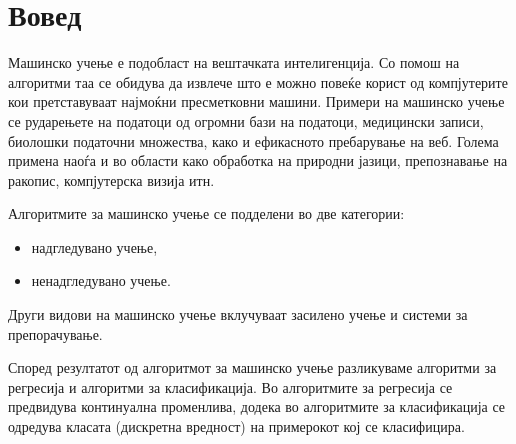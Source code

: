 \documentclass[12pt,a4paper]{article}
\begin{document}
\thispagestyle{empty}


\tableofcontents
\newpage

\listoffigures

\newpage

\section{Вовед}

Машинско учење е подобласт на вештачката интелигенција. Со помош на алгоритми
таа се обидува да извлече што е можно повеќе корист од компјутерите кои
претставуваат најмоќни пресметковни машини. Примери на машинско учење се
рударењете на податоци од огромни бази на податоци, медицински записи, биолошки
податочни множества, како и ефикасното пребарување на веб. Голема примена наоѓа
и во области како обработка на природни јазици, препознавање на ракопис,
компјутерска визија итн.

Алгоритмите за машинско учење се подделени во две категории:
\begin{itemize}
  \item надгледувано учење,
  \item ненадгледувано учење.
\end{itemize}
Други видови на машинско учење вклучуваат засилено учење и системи за
препорачување.

Според резултатот од алгоритмот за машинско учење разликуваме алгоритми за
регресија и алгоритми за класификација. Во алгоритмите за регресија се
предвидува континуална променлива, додека во алгоритмите за класификација се
одредува класата (дискретна вредност) на примерокот кој се класифицира.








\newpage

\nocite{*}


\end{document}
